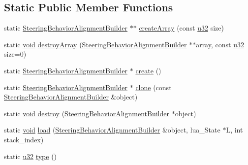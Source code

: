 \subsection*{Static Public Member Functions}
\begin{DoxyCompactItemize}
\item 
static \mbox{\hyperlink{classnjli_1_1_steering_behavior_alignment_builder}{Steering\+Behavior\+Alignment\+Builder}} $\ast$$\ast$ \mbox{\hyperlink{classnjli_1_1_steering_behavior_alignment_builder_a2b20b08ca30103ac16df269bd89fb446}{create\+Array}} (const \mbox{\hyperlink{_util_8h_a10e94b422ef0c20dcdec20d31a1f5049}{u32}} size)
\item 
static \mbox{\hyperlink{_thread_8h_af1e856da2e658414cb2456cb6f7ebc66}{void}} \mbox{\hyperlink{classnjli_1_1_steering_behavior_alignment_builder_a55285efb47a45d6237e0232bb452dbab}{destroy\+Array}} (\mbox{\hyperlink{classnjli_1_1_steering_behavior_alignment_builder}{Steering\+Behavior\+Alignment\+Builder}} $\ast$$\ast$array, const \mbox{\hyperlink{_util_8h_a10e94b422ef0c20dcdec20d31a1f5049}{u32}} size=0)
\item 
static \mbox{\hyperlink{classnjli_1_1_steering_behavior_alignment_builder}{Steering\+Behavior\+Alignment\+Builder}} $\ast$ \mbox{\hyperlink{classnjli_1_1_steering_behavior_alignment_builder_acefa2b1317e3025d7d7f7124bdeec9ec}{create}} ()
\item 
static \mbox{\hyperlink{classnjli_1_1_steering_behavior_alignment_builder}{Steering\+Behavior\+Alignment\+Builder}} $\ast$ \mbox{\hyperlink{classnjli_1_1_steering_behavior_alignment_builder_aee302479b172e0dffe63b095f2f28d2d}{clone}} (const \mbox{\hyperlink{classnjli_1_1_steering_behavior_alignment_builder}{Steering\+Behavior\+Alignment\+Builder}} \&object)
\item 
static \mbox{\hyperlink{_thread_8h_af1e856da2e658414cb2456cb6f7ebc66}{void}} \mbox{\hyperlink{classnjli_1_1_steering_behavior_alignment_builder_a45df5ac0cb661e03d677a058783d059e}{destroy}} (\mbox{\hyperlink{classnjli_1_1_steering_behavior_alignment_builder}{Steering\+Behavior\+Alignment\+Builder}} $\ast$object)
\item 
static \mbox{\hyperlink{_thread_8h_af1e856da2e658414cb2456cb6f7ebc66}{void}} \mbox{\hyperlink{classnjli_1_1_steering_behavior_alignment_builder_a694b9f9a03a628557b95092c8f85d029}{load}} (\mbox{\hyperlink{classnjli_1_1_steering_behavior_alignment_builder}{Steering\+Behavior\+Alignment\+Builder}} \&object, lua\+\_\+\+State $\ast$L, int stack\+\_\+index)
\item 
static \mbox{\hyperlink{_util_8h_a10e94b422ef0c20dcdec20d31a1f5049}{u32}} \mbox{\hyperlink{classnjli_1_1_steering_behavior_alignment_builder_a723346123c63ab5b229ce19e474178f5}{type}} ()
\end{DoxyCompactItemize}
